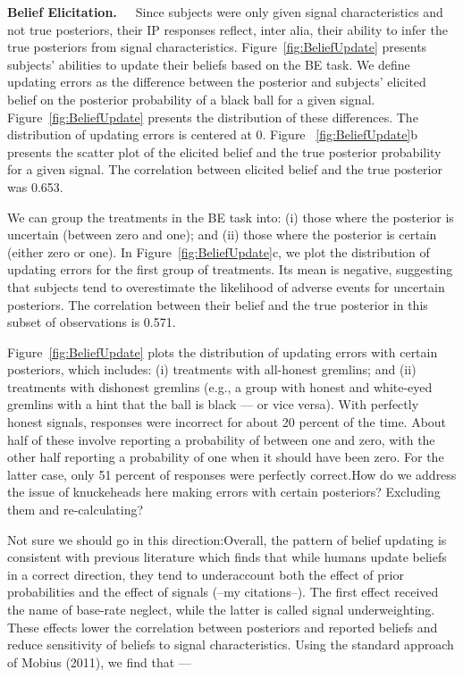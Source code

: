 \documentclass[12pt,a4paper]{article}
\newcommand{\aut}[1]{{\color{Red}#1}}
\begin{document}

\bigskip\noindent\textbf{Belief Elicitation.}\ \ \ Since subjects were only given signal characteristics and not true posteriors, their IP responses reflect, inter alia, their ability to infer the true posteriors from signal characteristics. 
Figure~\ref{fig:BeliefUpdate} presents subjects' abilities to update their beliefs based on the BE task. We define updating errors as the difference between the posterior and subjects’ elicited belief on the posterior probability of a black ball for a given signal. Figure~\ref{fig:BeliefUpdate} presents the distribution of these differences. The distribution of updating errors is centered at 0. Figure ~\ref{fig:BeliefUpdate}b presents the scatter plot of the elicited belief and the true posterior probability for a given signal. The correlation between elicited belief and the true posterior was 0.653. 

We can group the treatments in the BE task into: (i) those where the posterior is uncertain (between zero and one); and (ii) those where the posterior is certain (either zero or one). In Figure~\ref{fig:BeliefUpdate}c, we plot the distribution of updating errors for the first group of treatments. Its mean is negative, suggesting that subjects tend to overestimate the likelihood of adverse events for uncertain posteriors. The correlation between their belief and the true posterior in this subset of observations is 0.571.
 
Figure~\ref{fig:BeliefUpdate} plots the distribution of updating errors with certain posteriors, which includes: (i) treatments with all-honest gremlins; and (ii) treatments with dishonest gremlins (e.g., a group with honest and white-eyed gremlins with a hint that the ball is black — or vice versa). With perfectly honest signals, responses were incorrect for about 20 percent of the time. About half of these involve reporting a probability of between one and zero, with the other half reporting a probability of one when it should have been zero. For the latter case, only 51 percent of responses were perfectly correct.\aut{How do we address the issue of knuckeheads here making errors with certain posteriors? Excluding them and re-calculating?} 

\aut{Not sure we should go in this direction:}Overall, the pattern of belief updating is consistent with previous literature which finds that while humans update beliefs in a correct direction, they tend to underaccount both the effect of prior probabilities and the effect of signals (--my citations--). The first effect received the name of base-rate neglect, while the latter is called signal underweighting. These effects lower the correlation between posteriors and reported beliefs and reduce sensitivity of beliefs to signal characteristics. Using the standard approach of Mobius (2011), we find that --- 
\end{document}
